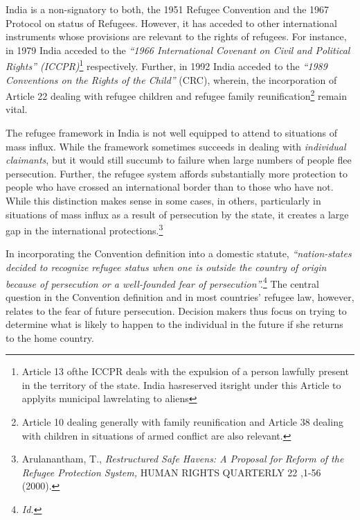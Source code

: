 \begin{multicols}{2}

\vspace{-.15cm}

\noi
India is a non-signatory to both, the 1951 Refugee Convention and the 1967 Protocol on
status of Refugees. However, it has acceded to other international instruments whose
provisions are relevant to the rights of refugees. For instance, in 1979 India acceded to the
\textit{“1966 International Covenant on Civil and Political Rights” (ICCPR)}\footnote{Article 13 ofthe ICCPR deals with the expulsion of a person lawfully present in the territory of the state. India hasreserved itsright under this Article to applyits municipal lawrelating to aliens} respectively. Further, in 1992 India acceded to the \textit{“1989 Conventions on the Rights of the Child”} (CRC), wherein, the incorporation of Article 22 dealing with refugee children and refugee family reunification\footnote{Article 10 dealing generally with family reunification and Article 38 dealing with children in situations of armed conflict are also relevant.} remain vital.

\vspace{-.15cm}


\vspace{-.15cm}

\noi
The refugee framework in India is not well equipped to attend to situations of mass influx.
While the framework sometimes succeeds in dealing with \textit{individual claimants}, but it would
still succumb to failure when large numbers of people flee persecution. Further, the refugee
system affords substantially more protection to people who have crossed an international
border than to those who have not. While this distinction makes sense in some cases, in
others, particularly in situations of mass influx as a result of persecution by the state, it creates
a large gap in the international protections.\footnote{Arulanantham, T., \textit{ Restructured Safe Havens: A Proposal for Reform of the Refugee Protection System,} HUMAN RIGHTS QUARTERLY 22 ,1-56 (2000).}

\vspace{-.15cm}

\noi
In incorporating the Convention definition into a domestic statute, \textit{“nation-states decided to
recognize refugee status when one is outside the country of origin because of persecution or a
well-founded fear of persecution”.}\footnote{\textit{Id.}} The central question in the Convention definition and in
most countries' refugee law, however, relates to the fear of future persecution. Decision
makers thus focus on trying to determine what is likely to happen to the individual in the
future if she returns to the home country.


\end{multicols}
